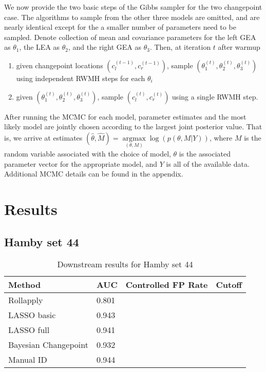 \documentclass[12pt]{article}
\providecommand{\tightlist}{%
  \setlength{\itemsep}{0pt}\setlength{\parskip}{0pt}}
\begin{document}
We now provide the two basic steps of the Gibbs sampler for the two
changepoint case. The algorithms to sample from the other three models
are omitted, and are nearly identical except for the a smaller number of
parameters need to be sampled. Denote collection of mean and covariance
parameters for the left GEA as \(\theta_1\), the LEA as \(\theta_2\),
and the right GEA as \(\theta_3\). Then, at iteration \(t\) after warmup

\begin{enumerate}
\def\labelenumi{\arabic{enumi}.}
\tightlist
\item
  given changepoint locations \((c_l^{(t - 1)}, c_r^{(t - 1)})\), sample
  \((\theta_1^{(t)}, \theta_2^{(t)}, \theta_3^{(t)})\) using independent
  RWMH steps for each \(\theta_i\)\\
\item
  given \((\theta_1^{(t)}, \theta_2^{(t)}, \theta_3^{(t)})\), sample
  \((c_l^{(t)}, c_r^{(t)})\) using a single RWMH step.
\end{enumerate}

After running the MCMC for each model, parameter estimates and the most
likely model are jointly chosen according to the largest joint posterior
value. That is, we arrive at estimates
\((\hat{\theta}, \hat{M}) = \underset{(\theta, M)}{\operatorname{argmax}}{\log(p(\theta, M | Y))}\),
where \(M\) is the random variable associated with the choice of model,
\(\theta\) is the associated parameter vector for the appropriate model,
and \(Y\) is all of the available data. Additional MCMC details can be
found in the appendix.

\section{Results}

\subsection{Hamby set 44}

\begin{table}[]
\centering
\caption{Downstream results for Hamby set 44}
\begin{tabular}{llll}
\textbf{Method} & \textbf{AUC} & \textbf{Controlled FP Rate} & \textbf{Cutoff} \\ \hline
Rollapply & 0.801 &  & \\ \hline
LASSO basic & 0.943 &  &  \\ \hline
LASSO full & 0.941 &  &  \\ \hline
Bayesian Changepoint & 0.932 &  & \\ \hline
Manual ID & 0.944 &  & \\ \hline 
\end{tabular}
\end{table}
\end{document}

